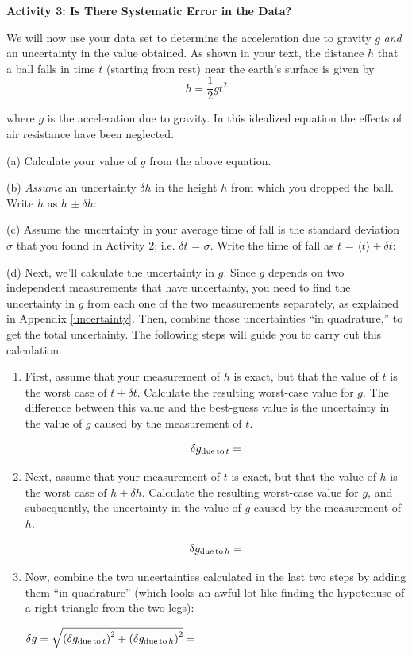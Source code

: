 \textbf{Activity 3: Is There Systematic Error in the Data? }

We will now use your data set to determine the acceleration due to gravity $g$ 
\emph{and} an uncertainty in the value obtained. As shown in your text, 
the distance $h$ that a ball falls in time $t$ (starting from rest) near the 
earth's surface is given by
\[
h=\frac{1}{2}gt^{2}\]


where $g$ is the acceleration due to gravity. In this idealized equation the 
effects of air resistance have been neglected. 

(a) Calculate your value of $g$ from the above equation.
\vspace{15mm}

(b) \emph{Assume} an uncertainty $\delta h$ in the height $h$ from 
which you dropped the ball. 
Write $h$ as $h$ \(\pm\ \delta h\):
\vspace{7mm}

(c) Assume the uncertainty in your average time of fall is the standard 
deviation \( \sigma  \) that you found in Activity 2; i.e. $\delta t$ = \(\sigma \).  Write the time of fall 
as $t$ = \(\langle t\rangle \pm  \delta t  \):
\vspace{7mm}

(d) Next, we'll calculate the uncertainty in $g$. Since $g$ depends on two independent measurements that have uncertainty, you need to find the uncertainty in $g$ from each one of the two measurements separately, as explained in Appendix \ref{uncertainty}. Then, combine those uncertainties ``in quadrature,'' to get the total uncertainty. The following steps will guide you to carry out this calculation.
\begin {enumerate}
\item  First, assume that your measurement of $h$  is exact, but that the value of $t$  is the worst case of $t + \delta t$. Calculate the resulting worst-case value for $g$. The difference between this value and the best-guess value is the uncertainty in the value of $g$ caused by the measurement of $t$. 

\vspace {20mm}
$$
\delta g_{ {\rm due\, to\,} t} =
$$

\item  Next, assume that your measurement of $t$ is exact, but that the value of $h$ is the worst case of $h+ \delta h$. Calculate the resulting worst-case value for $g$, and subsequently, the uncertainty in the value of $g$ caused by the measurement of $h$.

\vspace {12mm}
$$
\delta g_{ {\rm due\, to\,} h}=
$$


\item Now, combine the two uncertainties calculated in the last two steps by adding them ``in quadrature'' (which looks an awful lot like finding the hypotenuse of a right triangle from the two legs):

\vspace{4mm}
\hspace {5mm} $\delta g = \sqrt{ \left(\delta g_{{\rm due\, to\,} t}\right)^2 + \left(\delta g_{{\rm due\, to\,} h}\right)^2 } =$

\end {enumerate}


